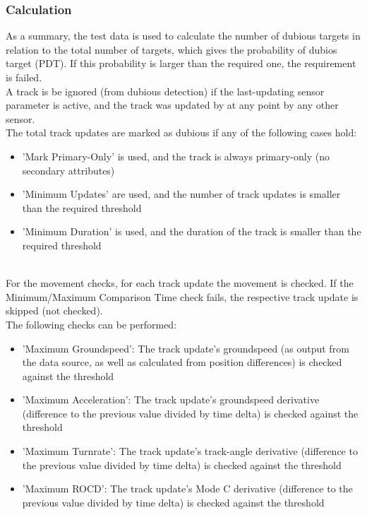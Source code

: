 \subsubsection{Calculation}

As a summary, the test data is used to calculate the number of dubious targets in relation to the total number of targets, which gives the probability of dubios target (PDT). If this probability is larger than the required one, the requirement is failed. \\

A track is be ignored (from dubious detection) if the last-updating sensor parameter is active, and the track was updated by at any point by any other sensor. \\

The total track updates are marked as dubious if any of the following cases hold:
\begin{itemize}  
\item 'Mark Primary-Only' is used, and the track is always primary-only (no secondary attributes)
\item 'Minimum Updates' are used, and the number of track updates is smaller than the required threshold
\item 'Minimum Duration' is used, and the duration of the track is smaller than the required threshold
\end{itemize}
\ \\

For the movement checks, for each track update the movement is checked. If the Minimum/Maximum Comparison Time check fails, the respective track update is skipped (not checked). \\ 

The following checks can be performed:
\begin{itemize}  
\item 'Maximum Groundspeed': The track update's groundspeed (as output from the data source, as well as calculated from position differences) is checked against the threshold
\item 'Maximum Acceleration': The track update's groundspeed derivative (difference to the previous value divided by time delta) is checked against the threshold
\item 'Maximum Turnrate': The track update's track-angle derivative (difference to the previous value divided by time delta) is checked against the threshold
\item 'Maximum ROCD': The track update's Mode C derivative (difference to the previous value divided by time delta) is checked against the threshold
\end{itemize}
\ \\

